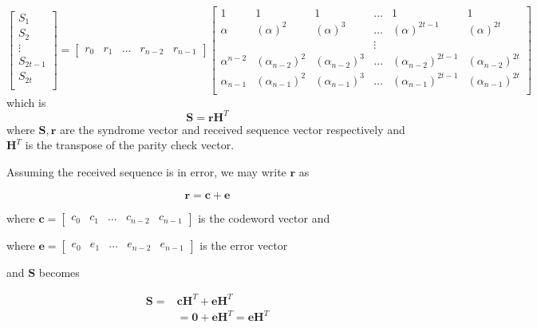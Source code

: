 \documentclass[fontsize=12pt]{article}
\begin{document}
\begin{equation}
\begin{bmatrix}
     S_{1}\\
    S_{2}\\
    \vdots{}\\
    S_{2t-1}\\
    S_{2t}\\
\end{bmatrix}
=
\begin{bmatrix}
    r_{0} & r_{1} & \dots{} & r_{n-2}& r_{n-1}   
\end{bmatrix}
\begin{bmatrix}
    1       &  1 &  1 & \dots &  1&  1 \\
    \alpha       &  ( \alpha )^2 &  ( \alpha )^3 & \dots &  ( \alpha )^{2t-1}&  ( \alpha )^{2t} \\
    &&&\vdots{} \\
    \alpha^{n-2}       &  (\alpha_{n-2})^2 &  (\alpha_{n-2} )^3 & \dots &   ( \alpha_{n-2} )^{2t-1}&  ( \alpha_{n-2} )^{2t} \\
    \alpha_{n-1}       &  ( \alpha_{n-1} )^2 &  (\alpha_{n-1})^3 & \dots &   ( \alpha_{n-1} )^{2t-1}&  ( \alpha_{n-1} )^{2t} \\
\end{bmatrix}
\label{nineteen}
\end{equation}
which is 
$$\mathbf{S}=\mathbf{r}\mathbf{H}^T$$
where $\mathbf{S},\mathbf{r}$ are the syndrome vector and received sequence vector
respectively and $\mathbf{H}^T$ is the transpose of the parity check vector.
 
 Assuming the received sequence is in error, we may write $\mathbf{r}$ as
 
 \begin{equation}
 \mathbf{r}=\mathbf{c}+\mathbf{e}
 \end{equation}
 
 where $\mathbf{c}=\begin{bmatrix}
    c_{0} & c_{1} & \dots{} & c_{n-2}& c_{n-1}   
\end{bmatrix}$ is the codeword vector and

where $\mathbf{e}=\begin{bmatrix}
    e_{0} & e_{1} & \dots{} & e_{n-2}& e_{n-1}   
\end{bmatrix}$ is the error vector 

 and $\mathbf{S}$ becomes 
 

 \begin{equation}
 \begin{split}
 \mathbf{S}=&\mathbf{c}\mathbf{H}^T+\mathbf{e}\mathbf{H}^T\\
 &=\mathbf{0}+\mathbf{e}\mathbf{H}^T = \mathbf{e}\mathbf{H}^T
 \end{split}
 \end{equation}




 
\end{document}
